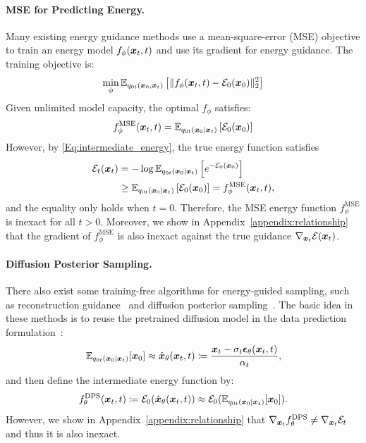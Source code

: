 \paragraph{MSE for Predicting Energy.}
Many existing energy guidance methods \citep{diffuser,bao2022equivariant} use a mean-square-error (MSE) objective to train an energy model $f_\phi({\bm{x}}_t, t)$ and use its gradient for energy guidance. The training objective is:
\begin{equation}
\label{Eq:MSE_qt_objective}
    \min_{\phi} \mathbb{E}_{q_{0t}({\bm{x}}_0, {\bm{x}}_t)} \left[
    \|f_\phi({\bm{x}}_t, t) - {\mathcal{E}}_0({\bm{x}}_0)\|_2^2
\right]
\end{equation}
Given unlimited model capacity, the optimal $f_\phi$ satisfies:
\begin{equation*}
\begin{split}
    f_\phi^\text{MSE}({\bm{x}}_t,t) = \mathbb{E}_{q_{0t}({\bm{x}}_0|{\bm{x}}_t)}\left[
        {\mathcal{E}}_0({\bm{x}}_0)
    \right]
\end{split}
\end{equation*}
However, by \eqref{Eq:intermediate_energy}, the true energy function satisfies
\begin{equation*}
\begin{aligned}
    {\mathcal{E}}_t({\bm{x}}_t) &= -\log \mathbb{E}_{q_{0t}({\bm{x}}_0|{\bm{x}}_t)}\left[
        e^{-{\mathcal{E}}_0({\bm{x}}_0)} \right] \\
        &\geq \mathbb{E}_{q_{0t}({\bm{x}}_0|{\bm{x}}_t)}\left[
        {\mathcal{E}}_0({\bm{x}}_0)\right] = f_\phi^\text{MSE}({\bm{x}}_t,t),
\end{aligned}
\end{equation*}
and the equality only holds when $t=0$. Therefore, the MSE energy function $f_\phi^{\text{MSE}}$ is inexact for all $t>0$. Moreover, we show in Appendix~\ref{appendix:relationship} that the gradient of $f_\phi^{\text{MSE}}$ is also inexact against the true guidance $\nabla_{{\bm{x}}_t}{\mathcal{E}}({\bm{x}}_t)$.

\paragraph{Diffusion Posterior Sampling.}
There also exist some training-free algorithms for energy-guided sampling, such as reconstruction guidance~\citep{ho2022video} and diffusion posterior sampling~\citep{chung2022diffusion}. The basic idea in these methods is to reuse the pretrained diffusion model in the data prediction formulation~\citep{kingma2021variational}:
\begin{equation*}
     \mathbb{E}_{q_{0t}({\bm{x}}_0|{\bm{x}}_t)}[{\bm{x}}_0] \approx \hat{{\bm{x}}}_\theta({\bm{x}}_t,t) \coloneqq \frac{{\bm{x}}_t - \sigma_t\bm{\epsilon}_\theta({\bm{x}}_t,t)}{\alpha_t},
\end{equation*}
and then define the intermediate energy function by:
\begin{equation*}
    f_\theta^{\text{DPS}}({\bm{x}}_t,t) \coloneqq {\mathcal{E}}_0(\hat{{\bm{x}}}_\theta({\bm{x}}_t,t)) \approx {\mathcal{E}}_0(\mathbb{E}_{q_{0t}({\bm{x}}_0|{\bm{x}}_t)}[{\bm{x}}_0]).
\end{equation*}
However, we show in Appendix~\ref{appendix:relationship} that $\nabla_{{\bm{x}}_t}f_\theta^{\text{DPS}}\neq \nabla_{{\bm{x}}_t}{\mathcal{E}}_t$ and thus it is also inexact.

